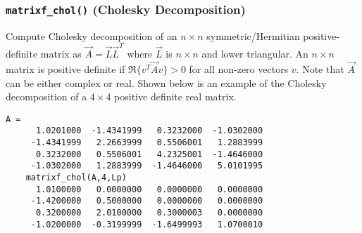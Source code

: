 \subsubsection{{\tt matrixf\_chol()}
               (Cholesky Decomposition)}
\label{module:matrix:chol}
Compute Cholesky decomposition of an $n \times n$ symmetric/Hermitian
positive-definite matrix as $\vec{A} = \vec{L}\vec{L}^T$
where $\vec{L}$ is $n \times n$ and lower triangular.
An $n \times n$ matrix is positive definite if
$\Re\{v^T \vec{A} v\} > 0$ for all non-zero vectors $v$.
Note that $\vec{A}$ can be either complex or real.
%
Shown below is an example of the Cholesky decomposition of a
$4 \times 4$ positive definite real matrix.
%
\begin{Verbatim}[fontsize=\small]
    A =
      1.0201000  -1.4341999   0.3232000  -1.0302000
     -1.4341999   2.2663999   0.5506001   1.2883999
      0.3232000   0.5506001   4.2325001  -1.4646000
     -1.0302000   1.2883999  -1.4646000   5.0101995
    matrixf_chol(A,4,Lp)
      1.0100000   0.0000000   0.0000000   0.0000000
     -1.4200000   0.5000000   0.0000000   0.0000000
      0.3200000   2.0100000   0.3000003   0.0000000
     -1.0200000  -0.3199999  -1.6499993   1.0700010
\end{Verbatim}



